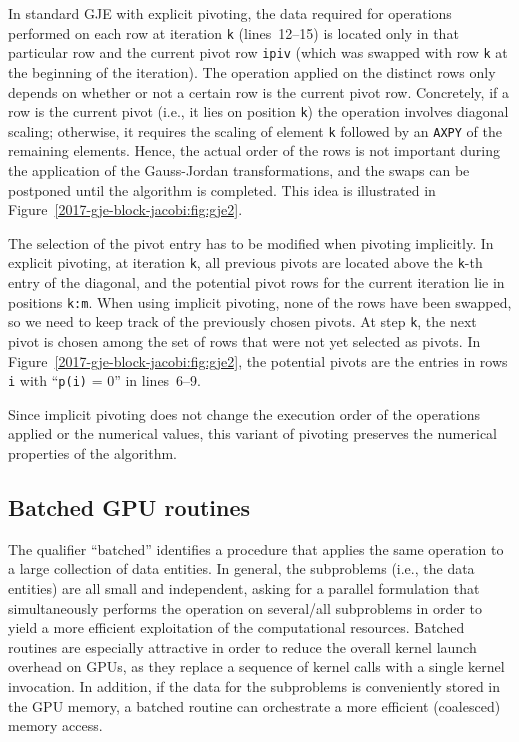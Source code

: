 In {standard GJE with} explicit pivoting, the data required for operations 
performed on each row at iteration \texttt{k} (lines~12--15)
is located only in that particular row
and the current pivot row \texttt{ipiv}
(which was swapped with row \texttt{k} at the beginning of the iteration).
The operation applied on the distinct rows only depends
on whether or not a certain row is the current pivot row.
{Concretely}, if a row is the current pivot (i.e., it lies on position \texttt{k})
the operation involves diagonal scaling;
otherwise, it requires the scaling of element \texttt{k} followed by an \texttt{AXPY}
of the remaining elements.
Hence, the actual order of the rows
is not important during the application of the Gauss-Jordan transformations,
and the swaps can be postponed until the algorithm is completed.
This idea is illustrated in Figure~\ref{2017-gje-block-jacobi:fig:gje2}.


The selection of the pivot entry has to be modified when pivoting implicitly.
In explicit pivoting, at iteration \texttt{k}, all previous pivots are located above the \texttt{k}-th entry of the diagonal,
and the potential pivot rows for the current iteration lie in positions \texttt{k:m}.
When using implicit pivoting, {none of the rows} have been swapped, so we need to keep 
track of the previously chosen pivots.
At step \texttt{k}, the next pivot is chosen among the set of rows
that were not yet selected as pivots.
In Figure~\ref{2017-gje-block-jacobi:fig:gje2}, the potential pivots are the entries in rows {\tt i} with ``\texttt{p(i)} = 0''  in lines~6--9.


Since implicit pivoting does not change the execution order of the 
operations applied or the numerical values,
this variant of pivoting preserves the numerical properties of the algorithm.

\subsection{Batched GPU routines} \label{2017-gje-block-jacobi:sec:batched}

The qualifier ``batched'' identifies a procedure that applies the same operation to a large collection of data entities.
In general, the subproblems (i.e., the data entities) are all small and independent, 
asking for a parallel formulation that
simultaneously performs the operation on several/all subproblems in order to
yield a more efficient exploitation of the computational resources.
Batched routines are especially attractive 
{in order to reduce} 
the overall kernel launch overhead on GPUs, as they replace a sequence of kernel calls with a single kernel invocation.
In addition, if the data for the subproblems is conveniently stored in the GPU memory,
a batched routine can orchestrate a more efficient (coalesced) memory access.

